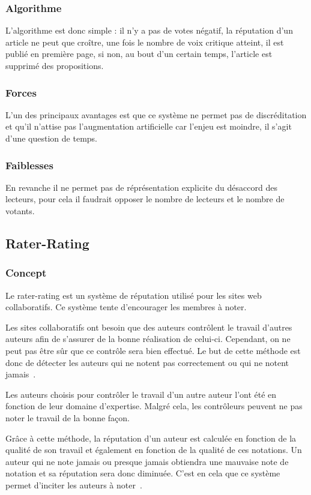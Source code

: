 \documentclass[a4paper, 11pt]{article} %
\begin{document}
\subsubsection{Algorithme}
L'algorithme est donc simple : il n'y a pas de votes négatif, la réputation d'un article ne peut que croître, une fois le nombre de voix critique atteint, il est publié en première page, si non, au bout d'un certain temps, l'article est supprimé des propositions.

\subsubsection{Forces}
L'un des principaux avantages est que ce système ne permet pas de discréditation et qu'il n'attise pas l'augmentation artificielle car l'enjeu est moindre, il s'agit d'une question de temps.

\subsubsection{Faiblesses}
En revanche il ne permet pas de réprésentation explicite du désaccord des lecteurs, pour cela il faudrait opposer le nombre de lecteurs et le nombre de votants.

\subsection{Rater-Rating}
\subsubsection{Concept}
Le rater-rating est un système de réputation utilisé pour les sites web collaboratifs. Ce système tente d'encourager les membres à noter.

Les sites collaboratifs ont besoin que des auteurs contrôlent le travail d'autres auteurs afin de s'assurer de la bonne réalisation de celui-ci. Cependant, on ne peut pas être sûr que ce contrôle sera bien effectué. Le but de cette méthode est donc de détecter les auteurs qui ne notent pas correctement ou qui ne notent jamais~\cite{RaterRating}.

Les auteurs choisis pour contrôler le travail d'un autre auteur l'ont été en fonction de leur domaine d'expertise. Malgré cela, les contrôleurs peuvent ne pas noter le travail de la bonne façon.

Grâce à cette méthode, la réputation d'un auteur est calculée en fonction de la qualité de son travail et également en fonction de la qualité de ces notations. Un auteur qui ne note jamais ou presque jamais obtiendra une mauvaise note de notation et sa réputation sera donc diminuée. C'est en cela que ce système permet d'inciter les auteurs à noter~\cite{RaterRating}.
\end{document}

